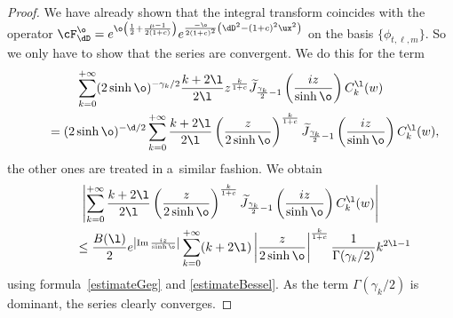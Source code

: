 \begin{proof}
We have already shown that the integral transform coincides with the operator $\cF_{\dD}^{\o}=
e^{\o\left(\frac{1}{2}+\frac{\mu-1}{2(1+c)}\right)}e^{\frac{-\o}{2(1+c)^{2}}\left(\dD^{2}-
(1+c)^{2}\ux^{2}\right)}$ on the basis $\{\phi_{t,\ell,m}\}$.
So we only have to show that the series are convergent.
We do this for the term
\begin{gather*}
\sum_{k=0}^{+\infty} (2 \sinh{\o})^{-\gamma_{k}/2} \frac{k+2\l}{2\l} z^{\frac{k}{1+c}}
\widetilde{J}_{\frac{\gamma_{k}}{2}-1}\left(\frac{iz}{\sinh{\o}}\right) C_{k}^{\l}(w)\\
\qquad
{}= (2 \sinh{\o})^{-\d/2} \sum_{k=0}^{+\infty} \frac{k+2\l}{2\l} \left(\frac{z}{2
\sinh{\o}}\right)^{\frac{k}{1+c}}
\widetilde{J}_{\frac{\gamma_{k}}{2}-1}\left(\frac{iz}{\sinh{\o}}\right) C_{k}^{\l}(w),
\end{gather*}
the other ones are treated in a~similar fashion.
We obtain
\begin{gather*}
\left| \sum_{k=0}^{+\infty} \frac{k+2\l}{2\l} \left(\frac{z}{2 \sinh{\o}}\right)^{\frac{k}{1+c}}
\widetilde{J}_{\frac{\gamma_{k}}{2}-1}\left(\frac{iz}{\sinh{\o}}\right) C_{k}^{\l}(w) \right| \\
\qquad
{}\leq \frac{B(\l)}{2}e^{\left|\operatorname{Im}{\frac{iz}{\sinh{\o}}}\right|}\sum_{k=0}^{+\infty}(k+2\l)\left|\frac{z}{2
\sinh{\o}}\right|^{\frac{k}{1+c}} \frac{1}{\Gamma(\gamma_{k}/2)} k^{2\l-1}
\end{gather*}
using formula~\eqref{estimateGeg} and \eqref{estimateBessel}.
As the term $\Gamma(\gamma_{k}/2)$ is dominant, the series clearly converges.
\end{proof}
